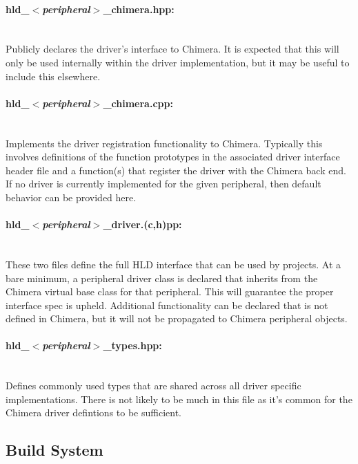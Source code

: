 \documentclass[10pt, letterpaper, tikz]{article}
\begin{document}
  \paragraph{hld\_$<$\emph{peripheral}$>$\_chimera.hpp:}\mbox{}\\
    Publicly declares the driver's interface to Chimera. It is expected that this will only be used internally
    within the driver implementation, but it may be useful to include this elsewhere.

  \paragraph{hld\_$<$\emph{peripheral}$>$\_chimera.cpp:}\mbox{}\\
    Implements the driver registration functionality to Chimera. Typically this involves definitions
    of the function prototypes in the associated driver interface header file and a function(s)
    that register the driver with the Chimera back end. If no driver is currently implemented for the
    given peripheral, then default behavior can be provided here.

  \paragraph{hld\_$<$\emph{peripheral}$>$\_driver.(c,h)pp:}\mbox{}\\
    These two files define the full HLD interface that can be used by projects. At a bare minimum, a
    peripheral driver class is declared that inherits from the Chimera virtual base class for that
    peripheral. This will guarantee the proper interface spec is upheld. Additional functionality can
    be declared that is not defined in Chimera, but it will not be propagated to Chimera peripheral
    objects.

  \paragraph{hld\_$<$\emph{peripheral}$>$\_types.hpp:}\mbox{}\\
    Defines commonly used types that are shared across all driver specific implementations. There is
    not likely to be much in this file as it's common for the Chimera driver defintions to be sufficient.

  \subsection{Build System}
\end{document}
